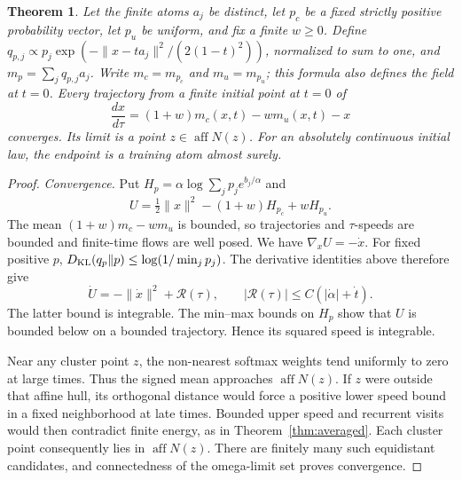 \documentclass[11pt]{article}
\newtheorem{theorem}{Theorem}
\begin{document}
\begin{theorem}\label{thm:cfg-as}
Let the finite atoms $a_j$ be distinct, let $p_c$ be a fixed strictly positive
probability vector, let $p_u$ be uniform, and fix a finite $w\ge0$.
Define $q_{p,j}\propto p_j\exp(-\lVert x-ta_j\rVert^2/(2(1-t)^2))$,
normalized to sum to one, and $m_p=\sum_jq_{p,j}a_j$.
Write $m_c=m_{p_c}$ and $m_u=m_{p_u}$; this formula also defines the field at
$t=0$. Every trajectory from a finite initial point at $t=0$ of
\[
\frac{dx}{d\tau}=(1+w)m_c(x,t)-wm_u(x,t)-x
\]
converges. Its limit is a point $z\in\operatorname{aff}N(z)$. For an absolutely
continuous initial law, the endpoint is a training atom almost surely.
\end{theorem}
\begin{proof}
\emph{Convergence.}
Put $H_p=\alpha\log\sum_jp_je^{b_j/\alpha}$ and
\[
U=\tfrac12\lVert x\rVert^2-(1+w)H_{p_c}+wH_{p_u}.
\]
The mean $(1+w)m_c-wm_u$ is bounded, so trajectories and $\tau$-speeds
are bounded and finite-time flows are well posed. We have $\nabla_xU=-\dot x$.
For fixed positive $p$, $D_{\rm KL}(q_p\Vert p)\le\log(1/\min_jp_j)$.
The derivative identities above therefore give
\[
\dot U=-\lVert\dot x\rVert^2+\mathcal R(\tau),\qquad
|\mathcal R(\tau)|\le C(|\dot\alpha|+\dot t).
\]
The latter bound is integrable. The min--max bounds on $H_p$ show that $U$
is bounded below on a bounded trajectory. Hence its squared speed is integrable.

Near any cluster point $z$, the non-nearest softmax weights tend uniformly to
zero at large times. Thus the signed mean approaches $\operatorname{aff}N(z)$.
If $z$ were outside that affine hull, its orthogonal distance would force a
positive lower speed bound in a fixed neighborhood at late times. Bounded upper
speed and recurrent visits would then contradict finite energy, as in
Theorem~\ref{thm:averaged}. Each cluster point consequently lies in
$\operatorname{aff}N(z)$. There are finitely many such equidistant candidates,
and connectedness of the omega-limit set proves convergence.


\end{proof}
\end{document}
